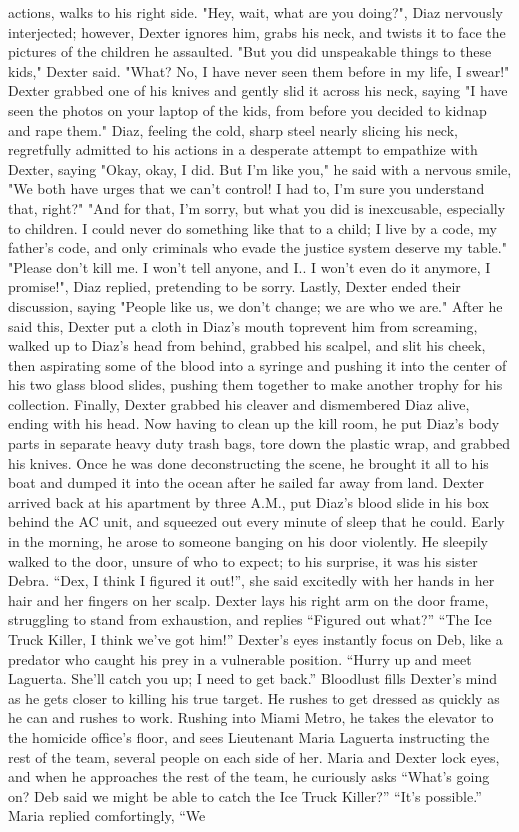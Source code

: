 \documentclass[12pt, letterpaper]{article}
\begin{document}
actions, walks to his right side. "Hey, wait, what are you doing?", Diaz nervously interjected; however, Dexter ignores him, grabs his neck, and twists it to face the pictures of the children he assaulted. "But you did unspeakable things to these kids," Dexter said. "What? No, I have never seen them before in my life, I swear!" Dexter grabbed one of his knives and gently slid it across his neck, saying "I have seen the photos on your laptop of the kids, from before you decided to kidnap and rape them." Diaz, feeling the cold, sharp steel nearly slicing his neck, regretfully admitted to his actions in a desperate attempt to empathize with Dexter, saying "Okay, okay, I did. But I'm like you," he said with a nervous smile, "We both have urges that we can't control! I had to, I'm sure you understand that, right?" "And for that, I'm sorry, but what you did is inexcusable, especially to children. I could never do something like that to a child; I live by a code, my father's code, and only criminals who evade the justice system deserve my table." "Please don't kill me. I won't tell anyone, and I.. I won't even do it anymore, I promise!", Diaz replied, pretending to be sorry. Lastly, Dexter ended their discussion, saying "People like us, we don't change; we are who we are." After he said this, Dexter put a cloth in Diaz's mouth toprevent him from screaming, walked up to Diaz's head from behind, grabbed his scalpel, and slit his cheek, then aspirating some of the blood into a syringe and pushing it into the center of his two glass blood slides, pushing them together to make another trophy for his collection. Finally, Dexter grabbed his cleaver and dismembered Diaz alive, ending with his head. Now having to clean up the kill room, he put Diaz's body parts in separate heavy duty trash bags, tore down the plastic wrap, and grabbed his knives. Once he was done deconstructing the scene, he brought it all to his boat and dumped it into the ocean after he sailed far away from land. Dexter arrived back at his apartment by three A.M., put Diaz's blood slide in his box behind the AC unit, and squeezed out every minute of sleep that he could. Early in the morning, he arose to someone banging on his door violently. He sleepily walked to the door, unsure of who to expect; to his surprise, it was his sister Debra. ``Dex, I think I figured it out!'', she said excitedly with her hands in her hair and her fingers on her scalp. Dexter lays his right arm on the door frame, struggling to stand from exhaustion, and replies ``Figured out what?'' ``The Ice Truck Killer, I think we've got him!'' Dexter's eyes instantly focus on Deb, like a predator who caught his prey in a vulnerable position. ``Hurry up and meet Laguerta. She'll catch you up; I need to get back.'' Bloodlust fills Dexter's mind as he gets closer to killing his true target. He rushes to get dressed as quickly as he can and rushes to work. Rushing into Miami Metro, he takes the elevator to the homicide office's floor, and sees Lieutenant Maria Laguerta instructing the rest of the team, several people on each side of her. Maria and Dexter lock eyes, and when he approaches the rest of the team, he curiously asks ``What's going on? Deb said we might be able to catch the Ice Truck Killer?'' ``It's possible.'' Maria replied comfortingly, ``We 
\end{document}
